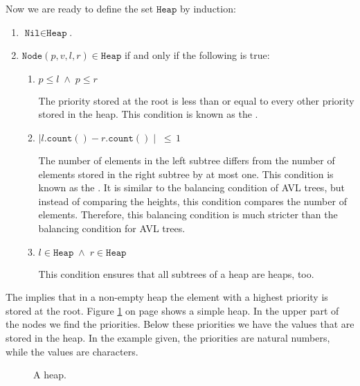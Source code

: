 Now we are ready to define the set $\texttt{Heap}$ by induction:
\begin{enumerate}
\item $\texttt{Nil} \in \texttt{Heap}$.
\item $\texttt{Node}(p,v,l,r) \in \texttt{Heap}$ if and only if the following is true:
      \begin{enumerate}
      \item $p \leq l \;\wedge\; p \leq r$

            The priority stored at the root is less than or equal to every other priority stored in
            the heap. This condition is known as the .
      \item $\mid l.\texttt{count}() - r.\texttt{count}() \mid \;\leq\, 1$

            The number of elements in the left subtree differs from the number of elements stored in
            the right subtree by at most one.
            This condition is known as the  .  It is similar to the
            balancing condition of AVL trees, but instead of comparing the heights, this condition
            compares the number of elements.  Therefore, this balancing condition is much stricter than the
            balancing condition for AVL trees.
      \item $l \in \texttt{Heap} \;\wedge\; r \in \texttt{Heap}$

            This condition ensures that all subtrees of a heap are heaps, too.
      \end{enumerate}
\end{enumerate}
The   implies that in a non-empty heap the element with a highest priority is
stored at the root.  Figure \ref{fig:heap-list} on page \pageref{fig:heap-list} shows a simple heap.
In the upper part of the nodes we find the priorities.  Below these priorities we have the values
that are stored in the heap.  In the example given, the priorities are natural numbers, while the
values are characters.


\begin{figure}[!t]
  \centering
  \caption{A heap.}
  \label{fig:heap-list}
\end{figure}

